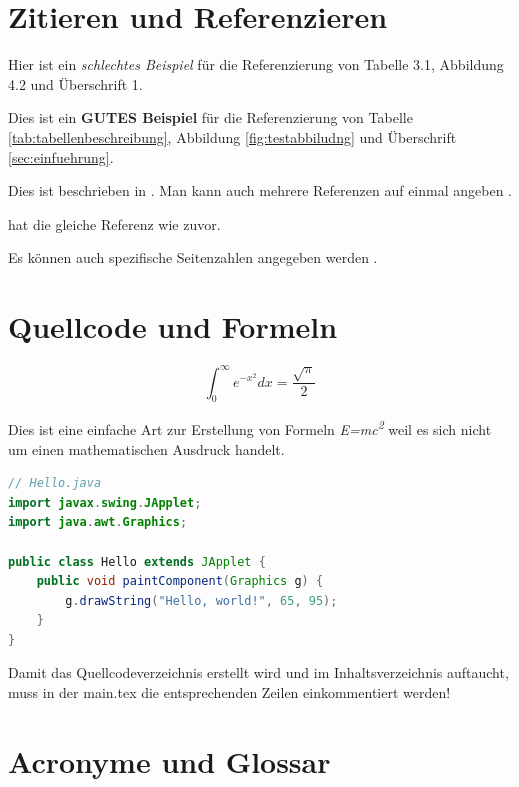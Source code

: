 \section{Zitieren und Referenzieren}
\label{sec:zitieren-und-referenzieren}

Hier ist ein \textit{schlechtes Beispiel} für die Referenzierung von Tabelle 3.1, Abbildung 4.2 und Überschrift 1.

Dies ist ein \textbf{GUTES Beispiel} für die Referenzierung von Tabelle \ref{tab:tabellenbeschreibung}, Abbildung \ref{fig:testabbiludng} und Überschrift \ref{sec:einfuehrung}.

Dies ist beschrieben in \cite{7516158}. Man kann auch mehrere Referenzen auf einmal angeben \cite{siriwardena_advanced_2014, levin_restful_2016}.

\cite{7516158} hat die gleiche Referenz wie zuvor.

Es können auch spezifische Seitenzahlen angegeben werden \cite[S. 17f.]{rfc:6838}.


\section{Quellcode und Formeln}
\label{sec:quellcode-und-formeln}

\begin{equation}
    \int_0^\infty e^{-x^2} dx=\frac{\sqrt{\pi}}{2}
    \label{eq:test-formula}
\end{equation}

Dies ist eine einfache Art zur Erstellung von Formeln \textit{E=mc\textsuperscript{2}} weil es sich nicht um einen mathematischen Ausdruck handelt.

\begin{lstlisting}[caption={Java Code Example}, captionpos=b, label={lst:example-java}, language=Java]
// Hello.java
import javax.swing.JApplet;
import java.awt.Graphics;

public class Hello extends JApplet {
    public void paintComponent(Graphics g) {
        g.drawString("Hello, world!", 65, 95);
    }
}
\end{lstlisting}

Damit das Quellcodeverzeichnis erstellt wird und im Inhaltsverzeichnis auftaucht, muss in der main.tex die entsprechenden Zeilen einkommentiert werden!


\section{Acronyme und Glossar}
\label{sec:acronym-und-glossar}

